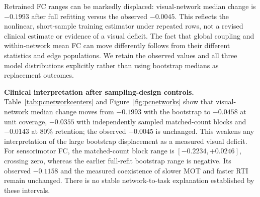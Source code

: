 \documentclass[11pt,a4paper]{article}
\begin{document}
Retrained FC ranges can be markedly displaced: visual-network median change is $-0.1993$ after full refitting versus the observed $-0.0045$. This reflects the nonlinear, short-sample training estimator under repeated rows, not a revised clinical estimate or evidence of a visual deficit. The fact that global coupling and within-network mean FC can move differently follows from their different statistics and edge populations. We retain the observed values and all three model distributions explicitly rather than using bootstrap medians as replacement outcomes.

\textbf{Clinical interpretation after sampling-design controls.} Table~\ref{tab:pcnetworkcenters} and Figure~\ref{fig:pcnetworks} show that visual-network median change moves from $-0.1993$ with the bootstrap to $-0.0458$ at unit coverage, $-0.0355$ with independently sampled matched-count blocks and $-0.0143$ at 80\% retention; the observed $-0.0045$ is unchanged. This weakens any interpretation of the large bootstrap displacement as a measured visual deficit. For sensorimotor FC, the matched-count block range is $[-0.2234,+0.0246]$, crossing zero, whereas the earlier full-refit bootstrap range is negative. Its observed $-0.1158$ and the measured coexistence of slower MOT and faster RTI remain unchanged. There is no stable network-to-task explanation established by these intervals.
\end{document}
